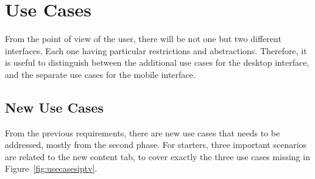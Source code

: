 \section{Use Cases} %
\label{sec:use_cases}

From the point of view of the user, there will be not one but two different interfaces.
Each one having particular restrictions and abstractions.
Therefore, it is useful to distinguish between the additional use cases for the desktop interface, and the separate use cases for the mobile interface.

\subsection{New Use Cases} %
\label{sub:new_use_cases}

From the previous requirements, there are new use cases that needs to be addressed, mostly from the second phase.
For starters, three important scenarios are related to the new content tab, to cover exactly the three use cases missing in Figure~\ref{fig:usecasesiptv}.

